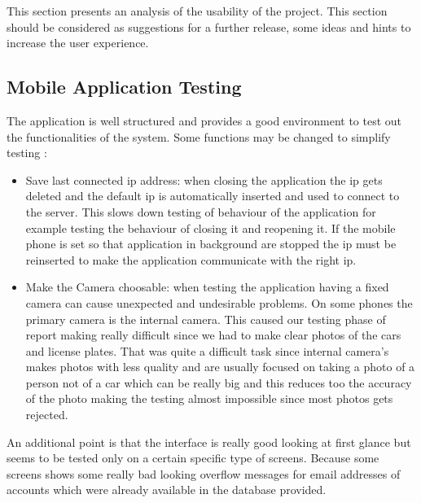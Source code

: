 This section presents an analysis of the usability of the project. This section should be considered as suggestions for a further release, some ideas and hints to increase the user experience.
\subsection{Mobile Application Testing}
The application is well structured and provides a good environment to test out the functionalities of the system.
Some functions may be changed to simplify testing :
\begin{itemize}
\item Save last connected ip address: when closing the application the ip gets deleted and the default ip is automatically inserted and used to connect to the server. This slows down testing of behaviour of the application for example testing the behaviour of closing it and reopening it. If the mobile phone is set so that application in background are stopped the ip must be reinserted to make the application communicate with the right ip.
\item Make the Camera choosable: when testing the application having a fixed camera can cause unexpected and undesirable problems. On some phones the primary camera is the internal camera. This caused our testing phase of report making really difficult since we had to make clear photos of the cars and license plates. That was quite a difficult task since internal camera's makes photos with less quality and are usually focused on taking a photo of a person not of a car which can be really big and this reduces too the accuracy of the photo making the testing almost impossible since most photos gets rejected.
\end{itemize}
An additional point is that the interface is really good looking at first glance but seems to be tested only on a certain specific type of screens. Because some screens shows some really bad looking overflow messages for email addresses of accounts which were already available in the database provided.

